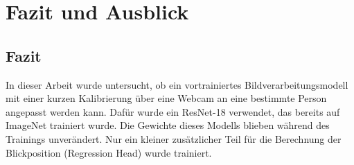 \chapter{Fazit und Ausblick}
\label{ch:fazit}

\section{Fazit}
\label{sec:fazit}
In dieser Arbeit wurde untersucht, ob ein vortrainiertes Bildverarbeitungsmodell
mit einer kurzen Kalibrierung über eine Webcam an eine bestimmte Person
angepasst werden kann. Dafür wurde ein ResNet-18 verwendet, das bereits auf
ImageNet trainiert wurde. Die Gewichte dieses Modells blieben während des
Trainings unverändert. Nur ein kleiner zusätzlicher Teil für die Berechnung der
Blickposition (Regression Head) wurde trainiert.

